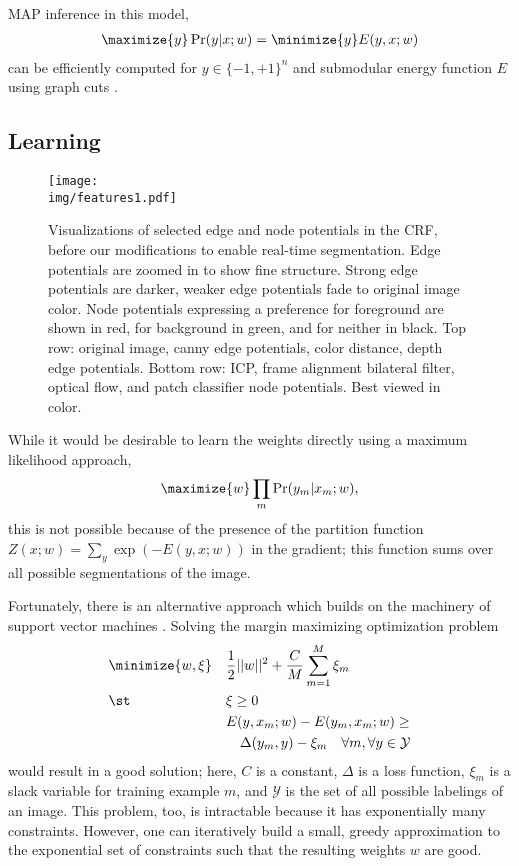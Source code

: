 \documentclass[conference]{IEEEtran}
\newcommand{\img}{img}
\begin{document}
MAP inference in this model,
\begin{align}
  \maximize{y} \Pr(y | x; w) = \minimize{y} E(y, x; w)
\end{align}
can be efficiently computed for $y \in \{-1, +1\}^n$ and submodular energy function $E$ using graph cuts \cite{boykov2001a}.

\subsection{Learning}
\label{sec:learning}

\begin{figure*}
  \centering
  \texttt{[image: \\img/features1.pdf]}
  \caption{Visualizations of selected edge and node potentials in the CRF, before our modifications to enable real-time segmentation.  Edge potentials are zoomed in to show fine structure.  Strong edge potentials are darker, weaker edge potentials fade to original image color.  Node potentials expressing a preference for foreground are shown in red, for background in green, and for neither in black.  Top row: original image, canny edge potentials, color distance, depth edge potentials.  Bottom row: ICP, frame alignment bilateral filter, optical flow, and patch classifier node potentials.  Best viewed in color.}
  \label{fig:features}
\end{figure*}


While it would be desirable to learn the weights directly using a maximum likelihood approach, \eg
\begin{align}
  \maximize{w} \prod_m \Pr(y_m | x_m; w),
\end{align}
this is not possible because of the presence of the partition function $Z(x; w) = \sum_{y} \exp(-E(y, x; w))$ in the gradient; this function sums over all possible segmentations of the image.
  
Fortunately, there is an alternative approach which builds on the machinery of support vector machines \cite{taskar2005a, tsochantaridis2005a, szummer2008a}.  Solving the margin maximizing optimization problem
\begin{equation}
  \begin{aligned}
    & \minimize{w, \xi} & & \frac{1}{2} ||w||^2 + \frac{C}{M} \sum_{m=1}^M \xi_m \label{eqn:nslack} \\
    & \st & & \xi \geq 0 \\
& & & E ( y, x_m; w ) - E ( y_m, x_m; w ) \geq \\
& & & \quad \Delta (y_m, y) - \xi_m \quad \forall m, \forall y \in \mathcal{Y}
  \end{aligned}
\end{equation}
would result in a good solution; here, $C$ is a constant, $\Delta$ is a loss function, $\xi_m$ is a slack variable for training example $m$, and $\mathcal{Y}$ is the set of all possible labelings of an image. This problem, too, is intractable because it has exponentially many constraints.  However, one can iteratively build a small, greedy approximation to the exponential set of constraints such that the resulting weights $w$ are good.
\end{document}
